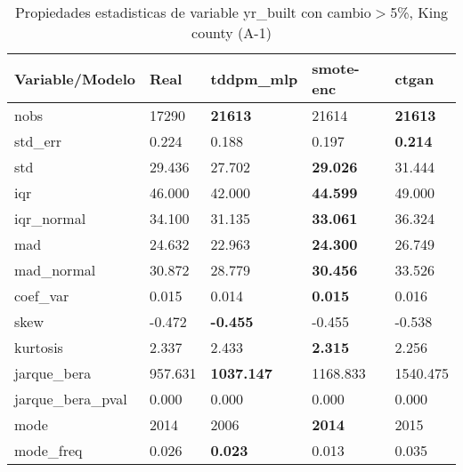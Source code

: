 \begin{table}[H]
\centering
\fontsize{8}{14}\selectfont
\caption{Propiedades estadisticas de variable yr\_built con cambio\ensuremath{>}5\%, King county (A-1)}
\label{table-stats-king county-a-1-yr_built-short}
\begin{tabular}{|l|m{10em}|m{10em}|m{10em}|m{10em}|}
\hline
 \rowcolor[gray]{0.8}
Variable/Modelo & Real & tddpm\_mlp & smote-enc & ctgan \\
\hline nobs & 17290 & \bfseries 21613 & \cellcolor[rgb]{0.9, 0.54, 0.52} 21614 & \bfseries 21613 \\
\hline std\_err & 0.224 & \cellcolor[rgb]{0.9, 0.54, 0.52} 0.188 & 0.197 & \bfseries 0.214 \\
\hline std & 29.436 & 27.702 & \bfseries 29.026 & \cellcolor[rgb]{0.9, 0.54, 0.52} 31.444 \\
\hline iqr & 46.000 & \cellcolor[rgb]{0.9, 0.54, 0.52} 42.000 & \bfseries 44.599 & 49.000 \\
\hline iqr\_normal & 34.100 & \cellcolor[rgb]{0.9, 0.54, 0.52} 31.135 & \bfseries 33.061 & 36.324 \\
\hline mad & 24.632 & 22.963 & \bfseries 24.300 & \cellcolor[rgb]{0.9, 0.54, 0.52} 26.749 \\
\hline mad\_normal & 30.872 & 28.779 & \bfseries 30.456 & \cellcolor[rgb]{0.9, 0.54, 0.52} 33.526 \\
\hline coef\_var & 0.015 & 0.014 & \bfseries 0.015 & \cellcolor[rgb]{0.9, 0.54, 0.52} 0.016 \\
\hline skew & -0.472 & \bfseries -0.455 & -0.455 & \cellcolor[rgb]{0.9, 0.54, 0.52} -0.538 \\
\hline kurtosis & 2.337 & \cellcolor[rgb]{0.9, 0.54, 0.52} 2.433 & \bfseries 2.315 & 2.256 \\
\hline jarque\_bera & 957.631 & \bfseries 1037.147 & 1168.833 & \cellcolor[rgb]{0.9, 0.54, 0.52} 1540.475 \\
\hline jarque\_bera\_pval & 0.000 & 0.000 & 0.000 & 0.000 \\
\hline mode & 2014 & \cellcolor[rgb]{0.9, 0.54, 0.52} 2006 & \bfseries 2014 & 2015 \\
\hline mode\_freq & 0.026 & \bfseries 0.023 & \cellcolor[rgb]{0.9, 0.54, 0.52} 0.013 & 0.035 \\
\hline
\end{tabular}
\end{table}
